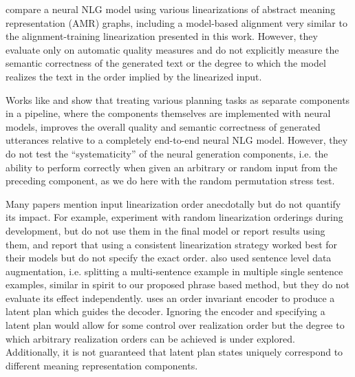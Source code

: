 \citet{castroferreira2017} compare a neural NLG model using various
linearizations of abstract meaning representation (AMR) graphs, including a
model-based alignment very similar to the alignment-training linearization
presented in this work. However, they evaluate only on automatic quality
measures and do not explicitly measure the semantic correctness of the
generated text or the degree to which the model realizes the text in the order
implied by the linearized input.

Works like \citet{moryossef2019a,moryossef2019b} and
\citet{castroferreira2019} show that treating various planning tasks as
separate components in a pipeline, where the components themselves are
implemented with neural models, improves the overall quality and semantic
correctness of generated utterances relative to a completely end-to-end neural
NLG model. However, they do not test the ``systematicity'' of the neural
generation components, i.e. the ability to perform correctly when given an
arbitrary or random input from the preceding component, as we do here with the
random permutation stress test.

Many papers mention input linearization order anecdotally but do not quantify
its impact. For example, \citet{juraska2018} experiment with random
linearization orderings during development, but do not use them in the final
model or report results using them, and \citet{gehrmann2018} report that using
a consistent linearization strategy worked best for their models but do not
specify the exact order.  \citet{juraska2018} also used sentence level data
augmentation, i.e. splitting a multi-sentence example in multiple single
sentence examples, similar in spirit to our proposed phrase based method, but
they do not evaluate its effect independently.  \citet{wiseman2018} uses an
order invariant encoder to produce a latent plan which guides the decoder.
Ignoring the encoder and specifying a latent plan would allow for some control
over realization order but the degree to which arbitrary realization orders
can be achieved is under explored. Additionally, it is not guaranteed that
latent plan states uniquely correspond to different meaning representation
components.
